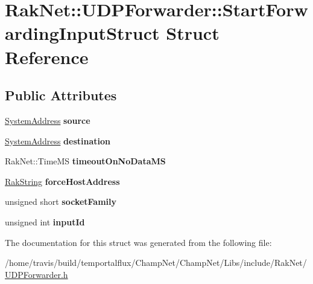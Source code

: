 \hypertarget{struct_rak_net_1_1_u_d_p_forwarder_1_1_start_forwarding_input_struct}{\section{Rak\-Net\-:\-:U\-D\-P\-Forwarder\-:\-:Start\-Forwarding\-Input\-Struct Struct Reference}
\label{struct_rak_net_1_1_u_d_p_forwarder_1_1_start_forwarding_input_struct}
}
\subsection*{Public Attributes}
\begin{DoxyCompactItemize}
\item 
\hypertarget{struct_rak_net_1_1_u_d_p_forwarder_1_1_start_forwarding_input_struct_ade7fb59272b914173d7cc359c332021a}{\hyperlink{struct_rak_net_1_1_system_address}{System\-Address} {\bfseries source}}\label{struct_rak_net_1_1_u_d_p_forwarder_1_1_start_forwarding_input_struct_ade7fb59272b914173d7cc359c332021a}

\item 
\hypertarget{struct_rak_net_1_1_u_d_p_forwarder_1_1_start_forwarding_input_struct_afad1179e8004f41346388b9fbeddf370}{\hyperlink{struct_rak_net_1_1_system_address}{System\-Address} {\bfseries destination}}\label{struct_rak_net_1_1_u_d_p_forwarder_1_1_start_forwarding_input_struct_afad1179e8004f41346388b9fbeddf370}

\item 
\hypertarget{struct_rak_net_1_1_u_d_p_forwarder_1_1_start_forwarding_input_struct_a6e3f7178a41aec83ed3e813aa81a6671}{Rak\-Net\-::\-Time\-M\-S {\bfseries timeout\-On\-No\-Data\-M\-S}}\label{struct_rak_net_1_1_u_d_p_forwarder_1_1_start_forwarding_input_struct_a6e3f7178a41aec83ed3e813aa81a6671}

\item 
\hypertarget{struct_rak_net_1_1_u_d_p_forwarder_1_1_start_forwarding_input_struct_ac8a7a613ce4e5bcc92a9562cdb8920b1}{\hyperlink{class_rak_net_1_1_rak_string}{Rak\-String} {\bfseries force\-Host\-Address}}\label{struct_rak_net_1_1_u_d_p_forwarder_1_1_start_forwarding_input_struct_ac8a7a613ce4e5bcc92a9562cdb8920b1}

\item 
\hypertarget{struct_rak_net_1_1_u_d_p_forwarder_1_1_start_forwarding_input_struct_abdf0f6bc9cd8a3d27db06f091ffaff43}{unsigned short {\bfseries socket\-Family}}\label{struct_rak_net_1_1_u_d_p_forwarder_1_1_start_forwarding_input_struct_abdf0f6bc9cd8a3d27db06f091ffaff43}

\item 
\hypertarget{struct_rak_net_1_1_u_d_p_forwarder_1_1_start_forwarding_input_struct_a194f7bf10b8c3deeb5c0ef89c2b8b532}{unsigned int {\bfseries input\-Id}}\label{struct_rak_net_1_1_u_d_p_forwarder_1_1_start_forwarding_input_struct_a194f7bf10b8c3deeb5c0ef89c2b8b532}

\end{DoxyCompactItemize}


The documentation for this struct was generated from the following file\-:\begin{DoxyCompactItemize}
\item 
/home/travis/build/temportalflux/\-Champ\-Net/\-Champ\-Net/\-Libs/include/\-Rak\-Net/\hyperlink{_u_d_p_forwarder_8h}{U\-D\-P\-Forwarder.\-h}\end{DoxyCompactItemize}
